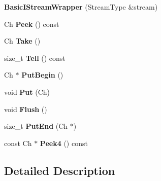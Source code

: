 \begin{DoxyCompactItemize}
\item 
{\bfseries Basic\+I\+Stream\+Wrapper} (Stream\+Type \&stream)\hypertarget{class_basic_i_stream_wrapper_a3e9a2dd2b6b28243f8f2a911f67cdf56}{}\label{class_basic_i_stream_wrapper_a3e9a2dd2b6b28243f8f2a911f67cdf56}

\item 
Ch {\bfseries Peek} () const \hypertarget{class_basic_i_stream_wrapper_ae0c3f22e0955034c3dc90c2398ff4742}{}\label{class_basic_i_stream_wrapper_ae0c3f22e0955034c3dc90c2398ff4742}

\item 
Ch {\bfseries Take} ()\hypertarget{class_basic_i_stream_wrapper_afb71f0329d0abbbc9b22ebeb5c1464d1}{}\label{class_basic_i_stream_wrapper_afb71f0329d0abbbc9b22ebeb5c1464d1}

\item 
size\+\_\+t {\bfseries Tell} () const \hypertarget{class_basic_i_stream_wrapper_a7da87efb1177bfaa131f33c0cb2873fc}{}\label{class_basic_i_stream_wrapper_a7da87efb1177bfaa131f33c0cb2873fc}

\item 
Ch $\ast$ {\bfseries Put\+Begin} ()\hypertarget{class_basic_i_stream_wrapper_a62a3fc10b009ea231fb9d2dc958c539c}{}\label{class_basic_i_stream_wrapper_a62a3fc10b009ea231fb9d2dc958c539c}

\item 
void {\bfseries Put} (Ch)\hypertarget{class_basic_i_stream_wrapper_afa71cb2f5b7668837d0a81e3bce55e69}{}\label{class_basic_i_stream_wrapper_afa71cb2f5b7668837d0a81e3bce55e69}

\item 
void {\bfseries Flush} ()\hypertarget{class_basic_i_stream_wrapper_a37d5e4cd8fdf3c83dad50737e95886a9}{}\label{class_basic_i_stream_wrapper_a37d5e4cd8fdf3c83dad50737e95886a9}

\item 
size\+\_\+t {\bfseries Put\+End} (Ch $\ast$)\hypertarget{class_basic_i_stream_wrapper_ab2ead53490207a1cb0bdd674a03957f3}{}\label{class_basic_i_stream_wrapper_ab2ead53490207a1cb0bdd674a03957f3}

\item 
const Ch $\ast$ {\bfseries Peek4} () const \hypertarget{class_basic_i_stream_wrapper_aaae0c7e7f2d06eb1638cce33ed664f31}{}\label{class_basic_i_stream_wrapper_aaae0c7e7f2d06eb1638cce33ed664f31}

\end{DoxyCompactItemize}


\subsection{Detailed Description}
